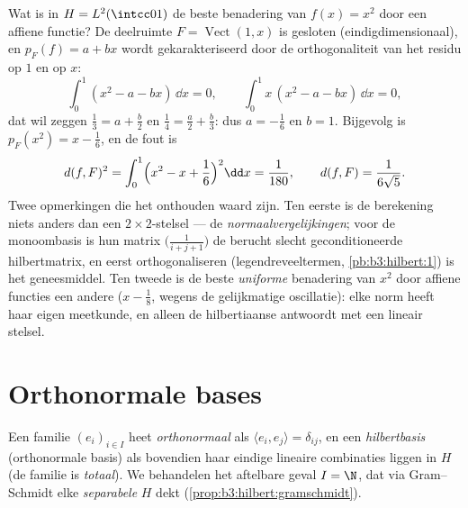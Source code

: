 \begin{example}
\label{ex:b3:hilbert:projectionexample}
Wat is in $H = L^2(\intcc01)$ de beste benadering van $f(x) =
x^2$ door een affiene functie? De deelruimte $F =
\operatorname{Vect}(1, x)$ is gesloten (eindigdimensionaal), en
$p_F(f) = a + bx$ wordt gekarakteriseerd door de orthogonaliteit
van het residu op $1$ en op $x$:
\[
\int_0^1(x^2 - a - bx)\,\dd x = 0,
\qquad
\int_0^1x\,(x^2 - a - bx)\,\dd x = 0,
\]
dat wil zeggen $\frac13 = a + \frac b2$ en $\frac14 = \frac a2 +
\frac b3$: dus $a = -\frac16$ en $b = 1$. Bijgevolg is $p_F(x^2)
= x - \frac16$, en de fout is
\[
d(f, F)^2 = \int_0^1\Bigl(x^2 - x + \frac16\Bigr)^2\dd x =
\frac1{180},
\qquad d(f, F) = \frac1{6\sqrt5} .
\]
Twee opmerkingen die het onthouden waard zijn. Ten eerste is de
berekening niets anders dan een $2\times2$-stelsel --- de
\emph{normaalvergelijkingen}; voor de monoombasis is hun matrix
$\bigl(\frac1{i+j+1}\bigr)$ de berucht slecht geconditioneerde
hilbertmatrix, en eerst orthogonaliseren (legendreveeltermen,
\cref{pb:b3:hilbert:1}) is het geneesmiddel. Ten tweede is de
beste \emph{uniforme} benadering van $x^2$ door affiene functies
een andere ($x - \frac18$, wegens de gelijkmatige oscillatie):
elke norm heeft haar eigen meetkunde, en alleen de hilbertiaanse
antwoordt met een lineair stelsel.
\end{example}

\section{Orthonormale bases}

\begin{definition}\label{def:b3:hilbert:onb}
Een familie $(e_i)_{i\in I}$ heet \emph{orthonormaal} als
$\langle e_i, e_j\rangle = \delta_{ij}$, en een
\emph{hilbertbasis} (orthonormale basis) als
bovendien haar eindige lineaire combinaties  liggen in $H$
(de familie is \emph{totaal}). We behandelen het aftelbare geval
$I = \N$, dat via Gram--Schmidt elke \emph{separabele} $H$ dekt
(\cref{prop:b3:hilbert:gramschmidt}).
\end{definition}

